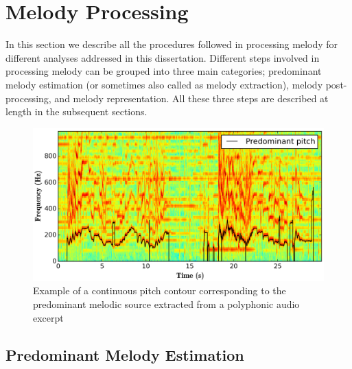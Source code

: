 {


\section{Melody Processing}
\label{sec:data_preprocessing_melody_processing}

In this section we describe all the procedures followed in processing melody for different analyses addressed in this dissertation. Different steps involved in processing melody can be grouped into three main categories; predominant melody estimation (or sometimes also called as melody extraction), melody post-processing, and melody representation. All these three steps are described at length in the subsequent sections. 

\begin{figure}
	\begin{center}
		\includegraphics[width=\figSizeHundred]{ch05_preprocessing/figures/predominantMelodyExample.png}
	\end{center}
	\caption{Example of a continuous pitch contour corresponding to the predominant melodic source extracted from a polyphonic audio excerpt}
	\label{fig:predominant_melodic_fragment}
\end{figure}


\subsection{Predominant Melody Estimation}
\label{sec:data_preprocessing_predominant_melody_estimation}

}
